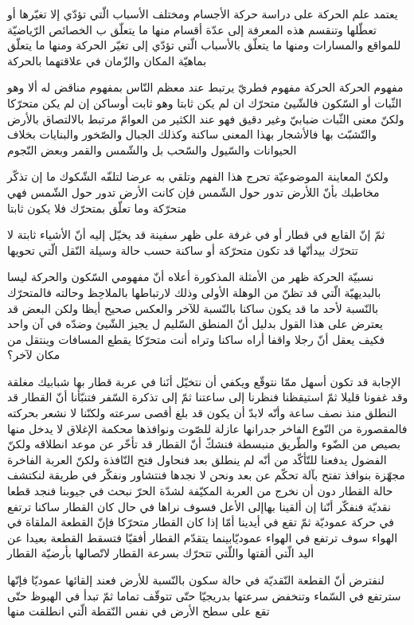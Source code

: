 يعتمد علم الحركة على دراسة حركة الأجسام ومختلف الأسباب الّتي تؤدّي إلا تغيّرها أو تعطّلها وتنقسم هذه المعرفة إلى عدّة أقسام منها ما يتعلّق ب الخصائص الرّياضيّة للمواقع والمسارات ومنها ما يتعلّق بالأسباب الّتي تؤدّي إلى تغيّر الحركة ومنها ما يتعلّق بماهيّة المكان والزّمان في علاقتهما بالحركة
\begin{section}{مفهوم الحركة}
الحركة مفهوم فطريّ يرتبط عند معظم النّاس بمفهوم مناقض له ألا وهو الثّبات أو السّكون فالشّيئ متحرّك ان لم يكن ثابتا وهو ثابت أوساكن إن لم يكن متحرّكا ولكنّ معنى الثّبات ضبابيّ وغير دقيق فهو عند الكثير من العوامّ مرتبط بالالتصاق بالأرض والتّشبّث بها فالأشجار بهذا المعنى ساكنة وكذلك الجبال والصّخور والبنايات بخلاف الحيوانات والسّيول والسّحب بل والشّمس والقمر وبعض النّجوم

ولكنّ المعاينة الموضوعيّة تحرج هذا الفهم وتلقي به عرضا لتلفّه الشّكوك ما إن تذكّر مخاطبك بأنّ اللأرض تدور حول الشّمس فإن كانت الأرض تدور حول الشّمس فهي متحرّكة وما تعلّق بمتحرّك فلا يكون ثابتا

ثمّ إنّ القابع في قطار أو في غرفة على ظهر سفينة قد يخيّل إليه أنّ الأشياء ثابتة لا تتحرّك بيدأنّها قد تكون متحرّكة أو ساكنة حسب حالة وسيلة النّقل الّتي تحويها
\begin{subsection}{نسبيّة الحركة}
ظهر من الأمثلة المذكورة أعلاه أنّ مفهومي السّكون والحركة ليسا بالبديهيّة الّتي قد تظنّ من الوهلة الأولى وذلك لارتباطها بالملاحِظ وحالته فالمتحرّك بالنّسبة لأحد ما قد يكون ساكنا بالنّسبة للآخر والعكس صحيح أيظا ولكن البعض قد يعترض على هذا القول بدليل أنّ المنطق السّليم ل يجيز الشّيئ وضدّه في آن واحد فكيف يعقل أنّ رجلا واقفا أراه ساكنا وتراه أنت متحرّكا يقطع المسافات وينتقل من مكان لآخر؟

الإجابة قد تكون أسهل ممّا نتوقّع ويكفي أن نتخيّل أنَنا في عربة قطار بها شبابيك مغلقة وقد غفونا قليلا ثمّ استيقظنا فنظرنا إلى ساعتنا ثمّ إلى تذكرة السّفر فتنبّأنا أنّ القطار قد النطلق منذ نصف ساعة وأنّه لابدّ أن يكون قد بلغ أقصى سرعته ولكنّنا لا نشعر بحركته فالمقصورة من النّوع الفاخر جدرانها عازلة للصّوت ونوافذها محكمة الإغلاق لا يدخل منها بصيص من الضّوء والطّريق منبسطة فنشكّ أنّ القطار قد تأخّر عن موعد انطلاقه ولكنّ الفضول يدفعنا للتّأكّد من أنّه لم ينطلق بعد فنحاول فتح النّافذة ولكنّ العربة الفاخرة مجهّزة بنوافذ تفتح بآلة تحكّم عن بعد ونحن لا نجدها فنتشاور ونفكّر في طريقة لنكتشف حالة القطار دون أن نخرج من العربة المكيّفة لشدّة الحرّ نبحث في جيوبنا فنجد قطعا نقديّة فنفكّر أنّنا إن ألقينا بهاإلى الأعل فسوف نراها في حال كان القطار ساكنا ترتفع في حركة عموديّة ثمّ تقع في أيدينا أمّا إذا كان القطار متحرّكا فإنّ القطعة الملقاة في الهواء سوف ترتفع في الهواء عموديّابينما يتقدّم القطار أفقيّا فتسقط القطعة بعيدا عن اليد الّتي ألقتها واللّتي تتحرّك بسرعة القطار لاتّصالها بأرضيّة القطار
\begin{center}
\begin{minipage}{\textwidth*3/4}
\begin{small}
لنفترض أنّ القطعة النّقديّة في حالة سكون بالنّسبة للأرض فعند إلقائها عموديّا فإنّها سترتفع في السّماء وتنخفض سرعتها بدريجيّا حتّى تتوقّف تماما ثمّ تبدأ في الهبوظ حتّى تقع على سطح الأرض في نفس النّقطة الّتي انطلقت منها


\end{small}
\end{minipage}
\end{center}
\end{subsection}
\end{section}
